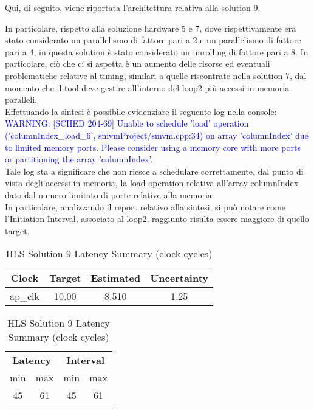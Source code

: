 Qui, di seguito, viene riportata l'architettura relativa alla solution 9.



In particolare, rispetto alla soluzione hardware 5 e 7, dove rispettivamente era stato considerato un parallelismo di fattore pari a 2 e un parallelismo di fattore pari a 4, in questa solution è stato considerato un unrolling di fattore pari a 8. In particolare, ciò che ci si aspetta è un aumento delle risorse ed eventuali problematiche relative al timing, similari a quelle riscontrate nella solution 7, dal momento che il tool deve gestire all'interno del loop2 più accessi in memoria paralleli.
\\
Effettuando la sintesi è possibile evidenziare il seguente log nella console:
\\
\textcolor{blue}{WARNING: [SCHED 204-69] Unable to schedule 'load' operation ('columnIndex\_load\_6', smvmProject/smvm.cpp:34) on array 'columnIndex' due to limited memory ports. Please consider using a memory core with more ports or partitioning the array 'columnIndex'.}
\\
Tale log sta a significare che non riesce a schedulare correttamente, dal punto di vista degli accessi in memoria, la load operation relativa all'array columnIndex dato dal numero limitato di porte relative alla memoria.
\\
In particolare, analizzando il report relativo alla sintesi, si può notare come l'Initiation Interval, associato al loop2, raggiunto risulta essere maggiore di quello target.
\\

\begin{table}[H]
	\centering
	\begin{minipage}[t]{0.45\linewidth}
		\centering
		\begin{tabular}{|c|c|c|c|}
			\hline
			\textbf{Clock} & \textbf{Target} & \textbf{Estimated} & \textbf{Uncertainty} \\
			\hline
			ap\_clk & 10.00 & 8.510 & 1.25 \\
			\hline
		\end{tabular}
		\caption{HLS Solution 9 Timing Summary (ns)}
		\label{tab:hls-solution-9-timing-summary}
	\end{minipage}
	\hfill
	\begin{minipage}[t]{0.45\linewidth}
		\centering
		\begin{tabular}{|c|c|c|c|}
			\hline
			\multicolumn{2}{|c|}{\textbf{Latency}} & \multicolumn{2}{|c|}{\textbf{Interval}} \\
			min & max & min & max \\
			\hline
			45 & 61 & 45 & 61 \\
			\hline
		\end{tabular}
		\caption{HLS Solution 9 Latency Summary (clock cycles)}
		\label{tab:hls-solution-9-latency-summary}
	\end{minipage}
\end{table}

